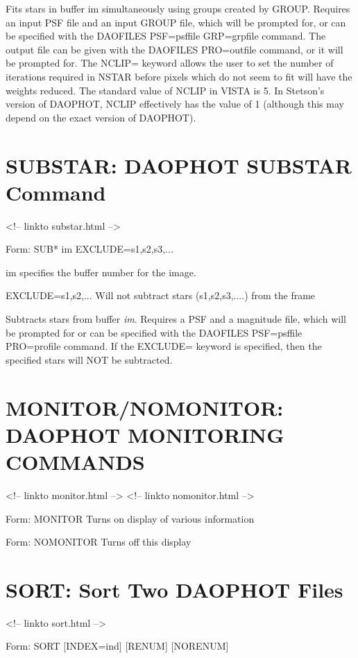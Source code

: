 Fits stars in buffer im simultaneously using groups created by GROUP.
Requires an input PSF file and an input GROUP file, which will be prompted
for, or can be specified with the DAOFILES PSF=psffile GRP=grpfile
command. The output file can be given with the DAOFILES PRO=outfile
command, or it will be prompted for. The NCLIP= keyword allows the user to
set the number of iterations required in NSTAR before pixels which do not
seem to fit will have the weights reduced.  The standard value of NCLIP in
VISTA is 5. In Stetson's version of DAOPHOT, NCLIP effectively has the
value of 1 (although this may depend on the exact version of DAOPHOT).

\section{SUBSTAR: DAOPHOT SUBSTAR Command}
\begin{rawhtml}
<!-- linkto substar.html -->
\end{rawhtml}
\begin{command}
  \item[Form: SUB* im EXCLUDE=s1,s2,s3,...\hfill]{}
  \item[im]{specifies the buffer number for the image.}
  \item[EXCLUDE=s1,s2,... ]{  Will not subtract stars (s1,s2,s3,....) from
    the frame}
\end{command}

Subtracts stars from buffer \textit{im}. Requires
a PSF and a magnitude file, which will be prompted for or can be specified
with the DAOFILES PSF=psffile PRO=profile command. If the EXCLUDE= keyword
is specified, then the specified stars will NOT be subtracted.

\section{MONITOR/NOMONITOR: DAOPHOT MONITORING COMMANDS}
\begin{rawhtml}
<!-- linkto monitor.html -->
<!-- linkto nomonitor.html -->
\end{rawhtml}
\begin{example}
  \item[Form: MONITOR\hfill]{Turns on display of various information}
  \item[Form: NOMONITOR\hfill]{Turns off this display}
\end{example}

\section{SORT: Sort Two DAOPHOT Files}
\begin{rawhtml}
<!-- linkto sort.html -->
\end{rawhtml}
\begin{command}
  \item[Form: SORT {[INDEX=ind]} {[RENUM]} {[NORENUM]}\hfill]{}
\end{command}

